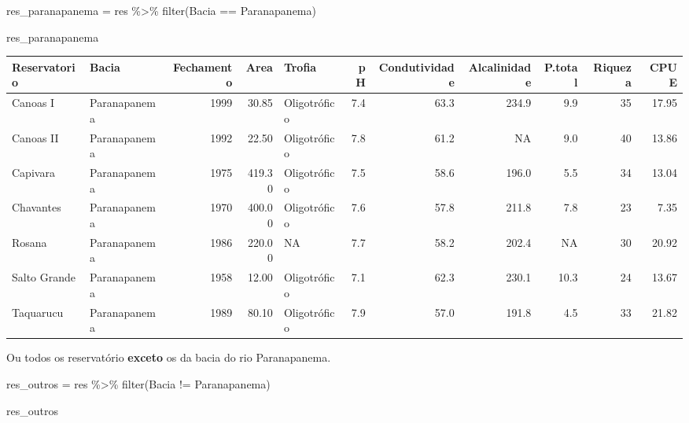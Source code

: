 \documentclass[
]{book}
\newenvironment{Shaded}{\begin{snugshade}}{\end{snugshade}}
\newcommand{\FunctionTok}[1]{\textcolor[rgb]{0.00,0.00,0.00}{#1}}
\newcommand{\NormalTok}[1]{#1}
\newcommand{\OtherTok}[1]{\textcolor[rgb]{0.56,0.35,0.01}{#1}}
\newcommand{\SpecialCharTok}[1]{\textcolor[rgb]{0.00,0.00,0.00}{#1}}
\newcommand{\StringTok}[1]{\textcolor[rgb]{0.31,0.60,0.02}{#1}}
\begin{document}
\begin{Shaded}
\begin{Highlighting}[]
\NormalTok{res\_paranapanema }\OtherTok{=}\NormalTok{ res }\SpecialCharTok{\%\textgreater{}\%} 
  \FunctionTok{filter}\NormalTok{(Bacia }\SpecialCharTok{==} \StringTok{\textquotesingle{}Paranapanema\textquotesingle{}}\NormalTok{)}

\NormalTok{res\_paranapanema}
\end{Highlighting}
\end{Shaded}

\begin{table}
\centering\begingroup\fontsize{8}{10}\selectfont

\begin{tabular}{llrrlrrrrrr}
\toprule
Reservatorio & Bacia & Fechamento & Area & Trofia & pH & Condutividade & Alcalinidade & P.total & Riqueza & CPUE\\
\midrule
Canoas I & Paranapanema & 1999 & 30.85 & Oligotrófico & 7.4 & 63.3 & 234.9 & 9.9 & 35 & 17.95\\
Canoas II & Paranapanema & 1992 & 22.50 & Oligotrófico & 7.8 & 61.2 & NA & 9.0 & 40 & 13.86\\
Capivara & Paranapanema & 1975 & 419.30 & Oligotrófico & 7.5 & 58.6 & 196.0 & 5.5 & 34 & 13.04\\
Chavantes & Paranapanema & 1970 & 400.00 & Oligotrófico & 7.6 & 57.8 & 211.8 & 7.8 & 23 & 7.35\\
Rosana & Paranapanema & 1986 & 220.00 & NA & 7.7 & 58.2 & 202.4 & NA & 30 & 20.92\\
\addlinespace
Salto Grande & Paranapanema & 1958 & 12.00 & Oligotrófico & 7.1 & 62.3 & 230.1 & 10.3 & 24 & 13.67\\
Taquarucu & Paranapanema & 1989 & 80.10 & Oligotrófico & 7.9 & 57.0 & 191.8 & 4.5 & 33 & 21.82\\
\bottomrule
\end{tabular}
\endgroup{}
\end{table}

Ou todos os reservatório \textbf{exceto} os da bacia do rio Paranapanema.

\begin{Shaded}
\begin{Highlighting}[]
\NormalTok{res\_outros }\OtherTok{=}\NormalTok{ res }\SpecialCharTok{\%\textgreater{}\%} 
  \FunctionTok{filter}\NormalTok{(Bacia }\SpecialCharTok{!=} \StringTok{\textquotesingle{}Paranapanema\textquotesingle{}}\NormalTok{)}

\NormalTok{res\_outros}
\end{Highlighting}
\end{Shaded}
\end{document}
